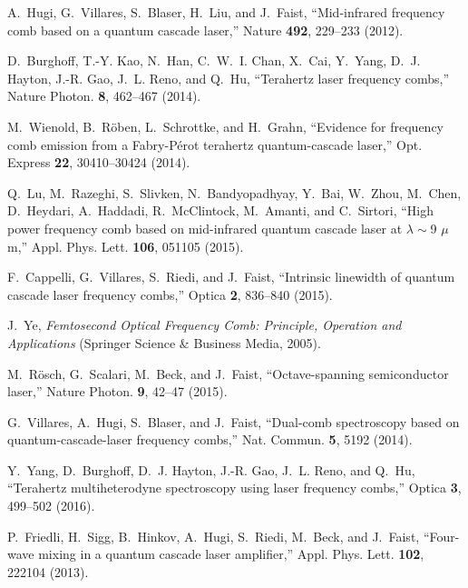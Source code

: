 \documentclass[10pt]{article}
\begin{document}
\begin{thebibliography}{10}
	\newcommand{\enquote}[1]{``#1''}
	
	A.~Hugi, G.~Villares, S.~Blaser, H.~Liu, and J.~Faist, \enquote{Mid-infrared
		frequency comb based on a quantum cascade laser,} Nature \textbf{492},
	229--233 (2012).
	
	D.~Burghoff, T.-Y. Kao, N.~Han, C.~W.~I. Chan, X.~Cai, Y.~Yang, D.~J. Hayton,
	J.-R. Gao, J.~L. Reno, and Q.~Hu, \enquote{Terahertz laser frequency combs,}
	Nature Photon. \textbf{8}, 462--467 (2014).
	
	M.~Wienold, B.~R{\"o}ben, L.~Schrottke, and H.~Grahn, \enquote{{Evidence for
			frequency comb emission from a Fabry-P{\'e}rot terahertz quantum-cascade
			laser},} Opt. Express \textbf{22}, 30410--30424 (2014).
	
	Q.~Lu, M.~Razeghi, S.~Slivken, N.~Bandyopadhyay, Y.~Bai, W.~Zhou, M.~Chen,
	D.~Heydari, A.~Haddadi, R.~McClintock, M.~Amanti, and C.~Sirtori,
	\enquote{High power frequency comb based on mid-infrared quantum cascade
		laser at $\lambda\sim$9 $\mu$m,} Appl. Phys. Lett. \textbf{106}, 051105
	(2015).
	
	F.~Cappelli, G.~Villares, S.~Riedi, and J.~Faist, \enquote{Intrinsic linewidth
		of quantum cascade laser frequency combs,} Optica \textbf{2}, 836--840
	(2015).
	
	J.~Ye, \emph{{Femtosecond Optical Frequency Comb: Principle, Operation and
			Applications}} (Springer Science \& Business Media, 2005).
	
	M.~R{\"o}sch, G.~Scalari, M.~Beck, and J.~Faist, \enquote{Octave-spanning
		semiconductor laser,} Nature Photon. \textbf{9}, 42--47 (2015).
	
	G.~Villares, A.~Hugi, S.~Blaser, and J.~Faist, \enquote{Dual-comb spectroscopy
		based on quantum-cascade-laser frequency combs,} Nat. Commun. \textbf{5},
	5192 (2014).
	
	Y.~Yang, D.~Burghoff, D.~J. Hayton, J.-R. Gao, J.~L. Reno, and Q.~Hu,
	\enquote{Terahertz multiheterodyne spectroscopy using laser frequency combs,}
	Optica \textbf{3}, 499--502 (2016).
	
	P.~Friedli, H.~Sigg, B.~Hinkov, A.~Hugi, S.~Riedi, M.~Beck, and J.~Faist,
	\enquote{Four-wave mixing in a quantum cascade laser amplifier,} Appl. Phys.
	Lett. \textbf{102}, 222104 (2013).
	

\end{thebibliography}
\end{document}
